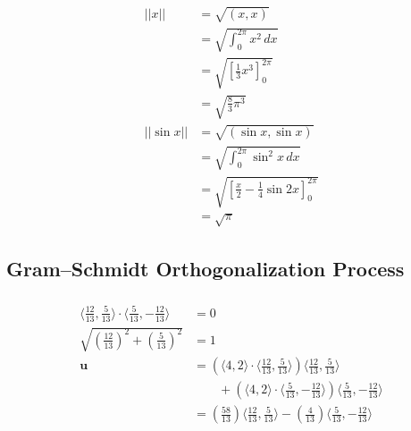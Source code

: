 \documentclass{article}
\begin{document}
\setcounter{subsubsection}{30}
\subsubsection{}

\begin{align*}
  ||x||      & = \sqrt{(x, x)}                                                      \\
             & = \sqrt{\int_0^{2 \pi} x^2 \,dx}                                     \\
             & = \sqrt{\left[ \frac{1}{3} x^3 \right]_0^{2 \pi}}                    \\
             & = \sqrt{\frac{8}{3} \pi^3}                                           \\
  ||\sin x|| & = \sqrt{(\sin x, \sin x)}                                            \\
             & = \sqrt{\int_0^{2 \pi} \sin^2 x \,dx}                                \\
             & = \sqrt{\left[ \frac{x}{2} - \frac{1}{4} \sin 2 x \right]_0^{2 \pi}} \\
             & = \sqrt{\pi}
\end{align*}

\subsection{Gram–Schmidt Orthogonalization Process}

\subsubsection{}

\begin{align*}
  \langle \frac{12}{13}, \frac{5}{13} \rangle \cdot \langle \frac{5}{13}, -\frac{12}{13} \rangle & = 0                                                                                                                                                   \\
  \sqrt{\left( \frac{12}{13} \right)^2 + \left( \frac{5}{13} \right)^2}                          & = 1                                                                                                                                                   \\
  \mathbf{u}                                                                                     & = \left( \langle 4, 2 \rangle \cdot \langle \frac{12}{13}, \frac{5}{13} \rangle \right) \langle \frac{12}{13}, \frac{5}{13} \rangle                   \\
                                                                                                 & \qquad + \left( \langle 4, 2 \rangle \cdot \langle \frac{5}{13}, -\frac{12}{13} \rangle \right) \langle \frac{5}{13}, -\frac{12}{13} \rangle          \\
                                                                                                 & = \left( \frac{58}{13} \right) \langle \frac{12}{13}, \frac{5}{13} \rangle - \left( \frac{4}{13} \right) \langle \frac{5}{13}, -\frac{12}{13} \rangle
\end{align*}
\end{document}

